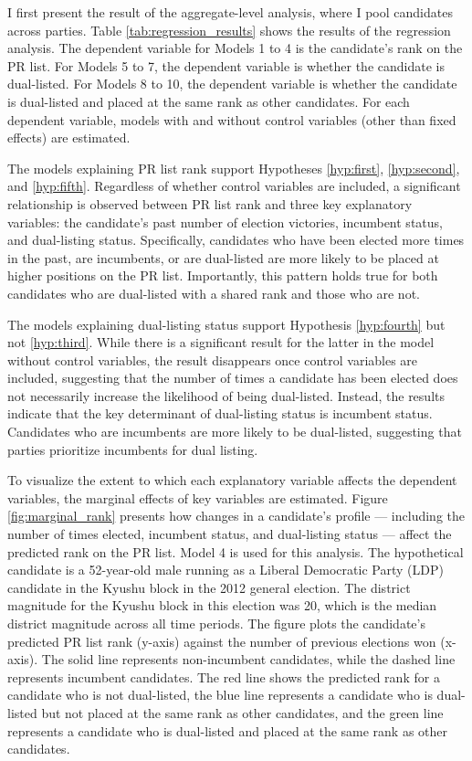 \documentclass[a4paper, 11pt]{article}
\begin{document}
I first present the result of the aggregate-level analysis, where I pool candidates across parties. Table \ref{tab:regression_results} shows the results of the regression analysis. The dependent variable for Models 1 to 4 is the candidate’s rank on the PR list. For Models 5 to 7, the dependent variable is whether the candidate is dual-listed. For Models 8 to 10, the dependent variable is whether the candidate is dual-listed and placed at the same rank as other candidates. For each dependent variable, models with and without control variables (other than fixed effects) are estimated.



The models explaining PR list rank support Hypotheses \ref{hyp:first}, \ref{hyp:second}, and \ref{hyp:fifth}. Regardless of whether control variables are included, a significant relationship is observed between PR list rank and three key explanatory variables: the candidate’s past number of election victories, incumbent status, and dual-listing status. Specifically, candidates who have been elected more times in the past, are incumbents, or are dual-listed are more likely to be placed at higher positions on the PR list. Importantly, this pattern holds true for both candidates who are dual-listed with a shared rank and those who are not.

The models explaining dual-listing status support Hypothesis \ref{hyp:fourth} but not \ref{hyp:third}. While there is a significant result for the latter in the model without control variables, the result disappears once control variables are included, suggesting that the number of times a candidate has been elected does not necessarily increase the likelihood of being dual-listed. Instead, the results indicate that the key determinant of dual-listing status is incumbent status. Candidates who are incumbents are more likely to be dual-listed, suggesting that parties prioritize incumbents for dual listing.

To visualize the extent to which each explanatory variable affects the dependent variables, the marginal effects of key variables are estimated. Figure \ref{fig:marginal_rank} presents how changes in a candidate’s profile — including the number of times elected, incumbent status, and dual-listing status — affect the predicted rank on the PR list. Model 4 is used for this analysis. The hypothetical candidate is a 52-year-old male running as a Liberal Democratic Party (LDP) candidate in the Kyushu block in the 2012 general election. The district magnitude for the Kyushu block in this election was 20, which is the median district magnitude across all time periods. The figure plots the candidate’s predicted PR list rank (y-axis) against the number of previous elections won (x-axis). The solid line represents non-incumbent candidates, while the dashed line represents incumbent candidates. The red line shows the predicted rank for a candidate who is not dual-listed, the blue line represents a candidate who is dual-listed but not placed at the same rank as other candidates, and the green line represents a candidate who is dual-listed and placed at the same rank as other candidates.
\end{document}

